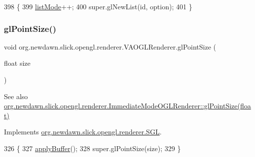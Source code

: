 \begin{DoxyCode}
398                                               \{
399         \mbox{\hyperlink{classorg_1_1newdawn_1_1slick_1_1opengl_1_1renderer_1_1_v_a_o_g_l_renderer_afee8361b229cada04ad11d9ee44c7284}{listMode}}++;
400         super.glNewList(\textcolor{keywordtype}{id}, option);
401     \}
\end{DoxyCode}
\mbox{\label{classorg_1_1newdawn_1_1slick_1_1opengl_1_1renderer_1_1_v_a_o_g_l_renderer_a51b4eb9ab5ed3efe4021472ffecb5041}} 
\subsubsection{\texorpdfstring{gl\+Point\+Size()}{glPointSize()}}
{\footnotesize\ttfamily void org.\+newdawn.\+slick.\+opengl.\+renderer.\+V\+A\+O\+G\+L\+Renderer.\+gl\+Point\+Size (\begin{DoxyParamCaption}\item[{float}]{size }\end{DoxyParamCaption})\hspace{0.3cm}{\ttfamily [inline]}}

\begin{DoxySeeAlso}{See also}
\mbox{\hyperlink{classorg_1_1newdawn_1_1slick_1_1opengl_1_1renderer_1_1_immediate_mode_o_g_l_renderer_a94ff70b3e1685df7109524b1a6e10b9c}{org.\+newdawn.\+slick.\+opengl.\+renderer.\+Immediate\+Mode\+O\+G\+L\+Renderer\+::gl\+Point\+Size(float)}} 
\end{DoxySeeAlso}


Implements \mbox{\hyperlink{interfaceorg_1_1newdawn_1_1slick_1_1opengl_1_1renderer_1_1_s_g_l_a29b20d7b222979b3edb3f069db9ec467}{org.\+newdawn.\+slick.\+opengl.\+renderer.\+S\+GL}}.


\begin{DoxyCode}
326                                         \{
327         \mbox{\hyperlink{classorg_1_1newdawn_1_1slick_1_1opengl_1_1renderer_1_1_v_a_o_g_l_renderer_a7c5d09419cd40761be8f849631aebab5}{applyBuffer}}();
328         super.glPointSize(size);
329     \}
\end{DoxyCode}
\mbox{\label{classorg_1_1newdawn_1_1slick_1_1opengl_1_1renderer_1_1_v_a_o_g_l_renderer_a9d7e65f8c87a2a10a24ef196a7f83d12}} 
